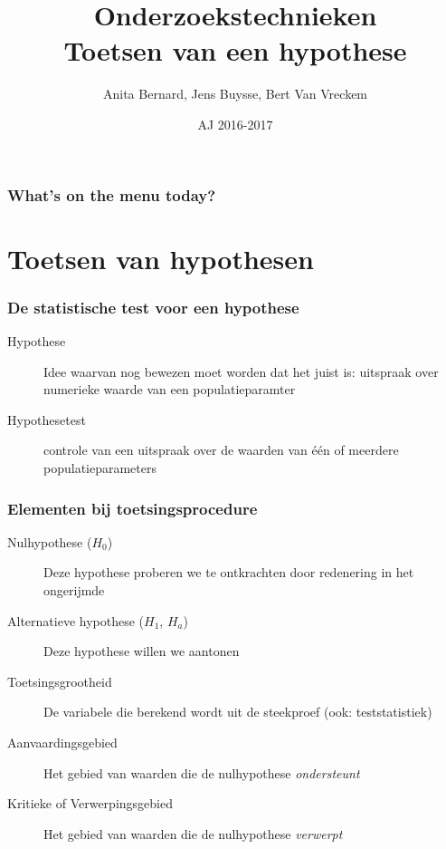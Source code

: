 \documentclass{beamer}
\title[Intro]{Onderzoekstechnieken\\Toetsen van een hypothese}
\author{Anita Bernard, Jens Buysse, Bert {Van Vreckem}}
\date{AJ 2016-2017}
\begin{document}

\HoGentLogo

\titleframe



\begin{frame}
  \frametitle{What's on the menu today?}

  \tableofcontents
\end{frame}

\section{Toetsen van hypothesen}
\sectionframelogo{}

\begin{frame}
  \frametitle{De statistische test voor een hypothese}

  \begin{description}
    \item[Hypothese] Idee waarvan nog bewezen moet worden dat het juist is: uitspraak over numerieke waarde van een populatieparamter
    \item[Hypothesetest] controle van een uitspraak over de waarden van één of meerdere populatieparameters
  \end{description}
\end{frame}

\begin{frame}
  \frametitle{Elementen bij toetsingsprocedure}

  \begin{description}
    \item[Nulhypothese ($H_0$)] Deze hypothese proberen we te ontkrachten door redenering in het ongerijmde
    \item[Alternatieve hypothese ($H_1$, $H_a$)] Deze hypothese willen we aantonen
    \item[Toetsingsgrootheid] De variabele die berekend wordt uit de steekproef (ook: teststatistiek)
    \item[Aanvaardingsgebied] Het gebied van waarden die de nulhypothese \emph{ondersteunt}
    \item[Kritieke of Verwerpingsgebied] Het gebied van waarden die de nulhypothese \emph{verwerpt}
  \end{description}
\end{frame}
\end{document}
